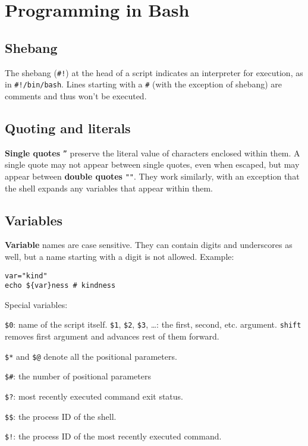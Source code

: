 \section{Programming in Bash}
\subsection{Shebang}
The shebang (\texttt{\#!}) at the head of a script indicates an 
interpreter for execution, as in \texttt{\#!/bin/bash}.
Lines starting with a \texttt{\#} (with the exception of shebang) 
are comments and thus won't be executed.

\subsection{Quoting and literals}
\textbf{Single quotes} \texttt{''} preserve the literal value of characters enclosed within them.
A single quote may not appear between single quotes, even when escaped, but may appear between \textbf{double quotes} \texttt{""}.
They work similarly, with an exception that the shell expands any variables that appear within them.

\subsection{Variables}
\textbf{Variable} names are case sensitive.
They can contain digits and underscores as well,
but a name starting with a digit is not allowed.
Example: 
\begin{verbatim}
var="kind"
echo ${var}ness # kindness
\end{verbatim}

Special variables:
\begin{enumx}
    \item \texttt{\$0}: name of the script itself. \texttt{\$1}, \texttt{\$2}, \texttt{\$3}, \ldots: the first, second, etc. argument. \texttt{shift} removes first argument and advances rest of them forward.
    \item \texttt{\$*} and \texttt{\$@} denote all the positional parameters.
    \item \texttt{\$\#}: the number of positional parameters
    \item \texttt{\$?}: most recently executed command exit status.
    \item \texttt{\$\$}: the process ID of the shell.
    \item \texttt{\$!}: the process ID of the most recently executed command.
\end{enumx}

